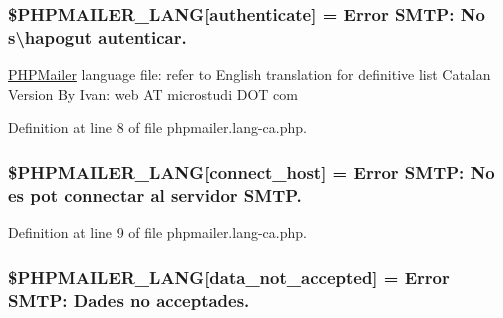 \subsubsection[{\texorpdfstring{\$\+P\+H\+P\+M\+A\+I\+L\+E\+R\+\_\+\+L\+A\+NG}{$PHPMAILER_LANG}}]{\setlength{\rightskip}{0pt plus 5cm}\$P\+H\+P\+M\+A\+I\+L\+E\+R\+\_\+\+L\+A\+NG\mbox{[}\textquotesingle{}authenticate\textquotesingle{}\mbox{]} = \textquotesingle{}Error S\+M\+T\+P\+: No s\textbackslash{}\textquotesingle{}hapogut autenticar.\textquotesingle{}}\hypertarget{phpmailer_8lang-ca_8php_a2cb33073c989b85580748e331ed8b4aa}{}\label{phpmailer_8lang-ca_8php_a2cb33073c989b85580748e331ed8b4aa}
\hyperlink{class_p_h_p_mailer}{P\+H\+P\+Mailer} language file\+: refer to English translation for definitive list Catalan Version By Ivan\+: web AT microstudi D\+OT com 

Definition at line 8 of file phpmailer.\+lang-\/ca.\+php.

\subsubsection[{\texorpdfstring{\$\+P\+H\+P\+M\+A\+I\+L\+E\+R\+\_\+\+L\+A\+NG}{$PHPMAILER_LANG}}]{\setlength{\rightskip}{0pt plus 5cm}\$P\+H\+P\+M\+A\+I\+L\+E\+R\+\_\+\+L\+A\+NG\mbox{[}\textquotesingle{}connect\+\_\+host\textquotesingle{}\mbox{]} = \textquotesingle{}Error S\+M\+T\+P\+: No es pot connectar al servidor S\+M\+T\+P.\textquotesingle{}}\hypertarget{phpmailer_8lang-ca_8php_a2ee0cc637a06b96e45600db31c6799ee}{}\label{phpmailer_8lang-ca_8php_a2ee0cc637a06b96e45600db31c6799ee}


Definition at line 9 of file phpmailer.\+lang-\/ca.\+php.

\subsubsection[{\texorpdfstring{\$\+P\+H\+P\+M\+A\+I\+L\+E\+R\+\_\+\+L\+A\+NG}{$PHPMAILER_LANG}}]{\setlength{\rightskip}{0pt plus 5cm}\$P\+H\+P\+M\+A\+I\+L\+E\+R\+\_\+\+L\+A\+NG\mbox{[}\textquotesingle{}data\+\_\+not\+\_\+accepted\textquotesingle{}\mbox{]} = \textquotesingle{}Error S\+M\+T\+P\+: Dades no acceptades.\textquotesingle{}}\hypertarget{phpmailer_8lang-ca_8php_a814c6b191205d2361b3233e9c9d6fda5}{}\label{phpmailer_8lang-ca_8php_a814c6b191205d2361b3233e9c9d6fda5}


